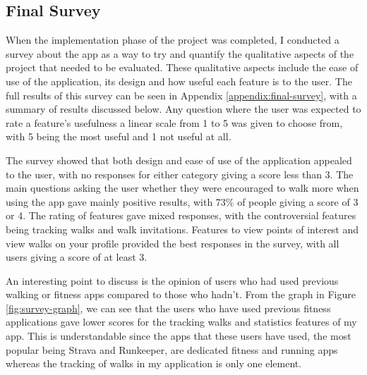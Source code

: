\subsection{Final Survey}


When the implementation phase of the project was completed, I conducted a survey about the app as a way to try and quantify the qualitative aspects of the project that needed to be evaluated. These qualitative aspects include the ease of use of the application, its design and how useful each feature is to the user. The full results of this survey can be seen in Appendix \ref{appendix:final-survey}, with a summary of results discussed below. Any question where the user was expected to rate a feature's usefulness a linear scale from 1 to 5 was given to choose from, with 5 being the most useful and 1 not useful at all.

The survey showed that both design and ease of use of the application appealed to the user, with no responses for either category giving a score less than 3. The main questions asking the user whether they were encouraged to walk more when using the app gave mainly positive results, with 73\% of people giving a score of 3 or 4. The rating of features gave mixed responses, with the controversial features being tracking walks and walk invitations. Features to view points of interest and view walks on your profile provided the best responses in the survey, with all users giving a score of at least 3.

An interesting point to discuss is the opinion of users who had used previous walking or fitness apps compared to those who hadn't. From the graph in Figure \ref{fig:survey-graph}, we can see that the users who have used previous fitness applications gave lower scores for the tracking walks and statistics features of my app. This is understandable since the apps that these users have used, the most popular being Strava and Runkeeper, are dedicated fitness and running apps whereas the tracking of walks in my application is only one element.

